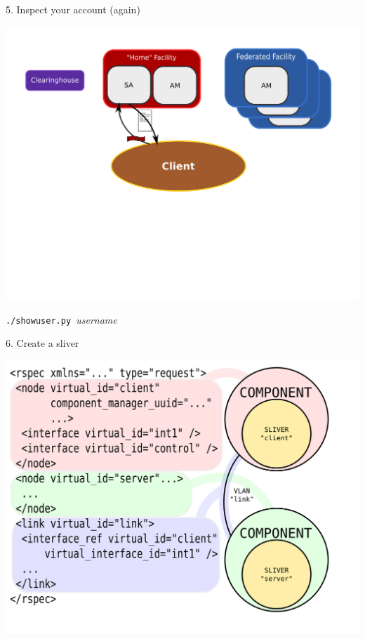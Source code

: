 \documentclass[landscape]{slides}
\newcommand{\heading}[1]{{\fontseries{b}\selectfont\begin{center}{\LARGE\color{red} #1}\end{center}}}
\begin{document}
\begin{slide}
\heading{5. Inspect your account (again)}
\begin{center}
\includegraphics[width=15cm]{tutorial-diagram-7}
\end{center}
\vspace{-4cm}
\begin{center}{\tt ./showuser.py }\emph{username}\end{center}
\end{slide}

\begin{slide}
\heading{6. Create a sliver}
\begin{center}
\includegraphics[width=15cm]{slice}
\end{center}
\end{slide}
\end{document}
